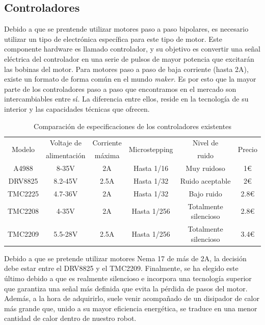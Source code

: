 \subsection{Controladores}
Debido a que se prentende utilizar motores paso a paso bipolares, es necesario utilizar un tipo de electrónica específica para 
este tipo de motor. Este componente hardware es llamado controlador, y su objetivo es convertir una señal eléctrica del controlador 
en una serie de pulsos de mayor potencia que excitarán las bobinas del motor. 
Para motores paso a paso de baja corriente (hasta 2A), existe un formato de forma común en el mundo \textit{maker}. Es por esto que la 
mayor parte de los controladores paso a paso que encontramos en el mercado son intercambiables entre sí. La diferencia entre ellos, reside 
en la tecnología de su interior y las capacidades técnicas que ofrecen. 
\begin{table}[htbp]
  \centering
  \caption{Comparación de especificaciones de los controladores existentes}
  \begin{tabular}{|c|c|c|c|c|c|}
      \hline
      \multirow{2}{*}{Modelo} & Voltaje de & Corriente & \multirow{2}{*}{Microstepping} & Nivel de & \multirow{2}{*}{Precio} \\
                             & alimentación & máxima & & ruido &\\
      \hline
      A4988 & 8-35V & 2A & Hasta 1/16 & Muy ruidoso & 1\euro \\
      \hline
      DRV8825 & 8.2-45V & 2.5A & Hasta 1/32 & Ruido aceptable & 2\euro \\
      \hline
      TMC2225 & 4.7-36V & 2A & Hasta 1/32 & Bajo ruido  & 2.8\euro \\
      \hline
      TMC2208 & 4-35V & 2A &  Hasta 1/256 & Totalmente silencioso & 2.8\euro \\
      \hline
      TMC2209 & 5.5-28V & 2.5A & Hasta 1/256 & Totalmente silencioso & 3.4\euro \\
      \hline
  \end{tabular}
\end{table}

Debido a que se pretende utilizar motores Nema 17 de más de 2A, la decisión debe estar entre el DRV8825 y el TMC2209. Finalmente, se 
ha elegido este último debido a que es realmente silencioso e incorpora una tecnología superior que garantiza una señal más definida que 
evita la pérdida de pasos del motor. Además, a la hora de adquirirlo, suele venir acompañado de un disipador de calor más grande que, unido 
a su mayor eficiencia energética, se traduce en una menor cantidad de calor dentro de nuestro robot. 

